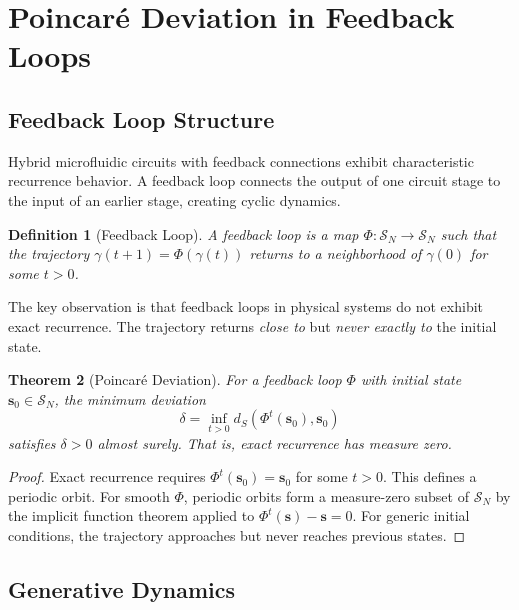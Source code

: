 \documentclass[aps,prl,twocolumn,superscriptaddress,showpacs]{revtex4-2}
\newtheorem{theorem}{Theorem}[section]
\newtheorem{definition}[theorem]{Definition}
\newcommand{\Sspace}{\mathcal{S}}
\newcommand{\traj}{\gamma}
\begin{document}
\section{Poincar\'{e} Deviation in Feedback Loops}
\label{sec:poincare}

\subsection{Feedback Loop Structure}

Hybrid microfluidic circuits with feedback connections exhibit characteristic recurrence behavior. A feedback loop connects the output of one circuit stage to the input of an earlier stage, creating cyclic dynamics.

\begin{definition}[Feedback Loop]
A feedback loop is a map $\Phi: \Sspace_N \to \Sspace_N$ such that the trajectory $\traj(t+1) = \Phi(\traj(t))$ returns to a neighborhood of $\traj(0)$ for some $t > 0$.
\end{definition}

The key observation is that feedback loops in physical systems do not exhibit exact recurrence. The trajectory returns \emph{close to} but \emph{never exactly to} the initial state.

\begin{theorem}[Poincar\'{e} Deviation]
\label{thm:poincare}
For a feedback loop $\Phi$ with initial state $\mathbf{s}_0 \in \Sspace_N$, the minimum deviation
\begin{equation}
\delta = \inf_{t > 0} d_S(\Phi^t(\mathbf{s}_0), \mathbf{s}_0)
\end{equation}
satisfies $\delta > 0$ almost surely. That is, exact recurrence has measure zero.
\end{theorem}

\begin{proof}
Exact recurrence requires $\Phi^t(\mathbf{s}_0) = \mathbf{s}_0$ for some $t > 0$. This defines a periodic orbit. For smooth $\Phi$, periodic orbits form a measure-zero subset of $\Sspace_N$ by the implicit function theorem applied to $\Phi^t(\mathbf{s}) - \mathbf{s} = 0$. For generic initial conditions, the trajectory approaches but never reaches previous states.
\end{proof}

\subsection{Generative Dynamics}
\end{document}
